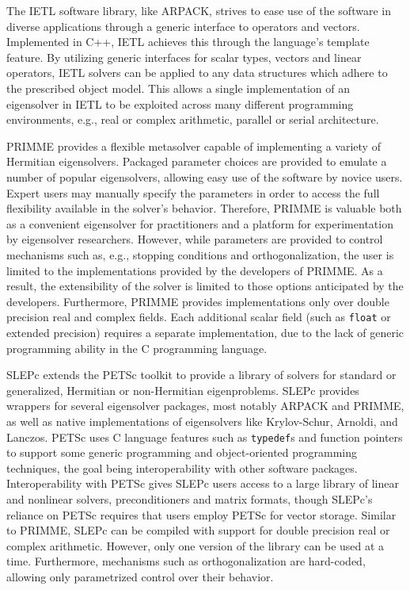 \documentclass[acmtoms]{acmtrans2m}
\begin{document}
The IETL software library, like ARPACK, strives to ease use of the software in diverse
applications through a generic interface to operators and vectors. Implemented in C++,
IETL achieves this through the language's template feature. By utilizing generic
interfaces for scalar types, vectors and linear operators, IETL solvers can be applied to
any data structures which adhere to the prescribed object model. This allows a single
implementation of an eigensolver in IETL to be exploited across many different programming
environments, e.g., real or complex arithmetic, parallel or serial architecture.

PRIMME provides a flexible metasolver capable of implementing a variety of Hermitian
eigensolvers. Packaged parameter choices are provided to emulate a number of popular
eigensolvers, allowing easy use of the software by novice users. Expert users may manually
specify the parameters in order to access the full flexibility available in the solver's
behavior. Therefore, PRIMME is valuable both as a convenient eigensolver for practitioners
and a platform for experimentation by eigensolver researchers. However, while parameters
are provided to control mechanisms such as, e.g., stopping conditions and
orthogonalization, the user is limited to the implementations provided by the developers
of PRIMME. As a result, the extensibility of the solver is limited to those options
anticipated by the developers. Furthermore, PRIMME provides implementations only over
double precision real and complex fields. Each additional scalar field (such as
\texttt{float} or extended precision) requires a separate implementation, due to the lack
of generic programming ability in the C programming language.

SLEPc extends the PETSc toolkit to provide a library of solvers for standard or
generalized, Hermitian or non-Hermitian eigenproblems. SLEPc provides wrappers for several
eigensolver packages, most notably ARPACK and PRIMME, as well as native implementations of
eigensolvers like Krylov-Schur, Arnoldi, and Lanczos. PETSc uses C language features such
as \texttt{typedef}s and function pointers to support some generic programming and
object-oriented programming techniques, the goal being interoperability with other
software packages. Interoperability with PETSc gives SLEPc users access to a large library
of linear and nonlinear solvers, preconditioners and matrix formats, though SLEPc's
reliance on PETSc requires that users employ PETSc for vector storage. Similar to PRIMME,
SLEPc can be compiled with support for double precision real or complex arithmetic.
However, only one version of the library can be used at a time. Furthermore, mechanisms
such as orthogonalization are hard-coded, allowing only parametrized control over their
behavior. 
\end{document}
